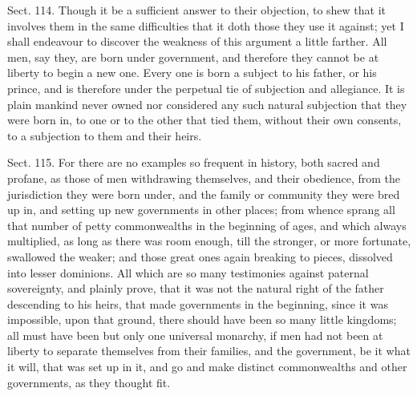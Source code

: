 \documentclass[11pt,openany]{book}
\begin{document}
Sect. 114. Though it be a sufficient answer to their objection, to shew that it involves them in the same difficulties that it doth those they use it against; yet I shall endeavour to discover the weakness of this argument a little farther. All men, say they, are born under government, and therefore they cannot be at liberty to begin a new one. Every one is born a subject to his father, or his prince, and is therefore under the perpetual tie of subjection and allegiance. It is plain mankind never owned nor considered any such natural subjection that they were born in, to one or to the other that tied them, without their own consents, to a subjection to them and their heirs.

Sect. 115. For there are no examples so frequent in history, both sacred and profane, as those of men withdrawing themselves, and their obedience, from the jurisdiction they were born under, and the family or community they were bred up in, and setting up new governments in other places; from whence sprang all that number of petty commonwealths in the beginning of ages, and which always multiplied, as long as there was room enough, till the stronger, or more fortunate, swallowed the weaker; and those great ones again breaking to pieces, dissolved into lesser dominions. All which are so many testimonies against paternal sovereignty, and plainly prove, that it was not the natural right of the father descending to his heirs, that made governments in the beginning, since it was impossible, upon that ground, there should have been so many little kingdoms; all must have been but only one universal monarchy, if men had not been at liberty to separate themselves from their families, and the government, be it what it will, that was set up in it, and go and make distinct commonwealths and other governments, as they thought fit.
\end{document}
